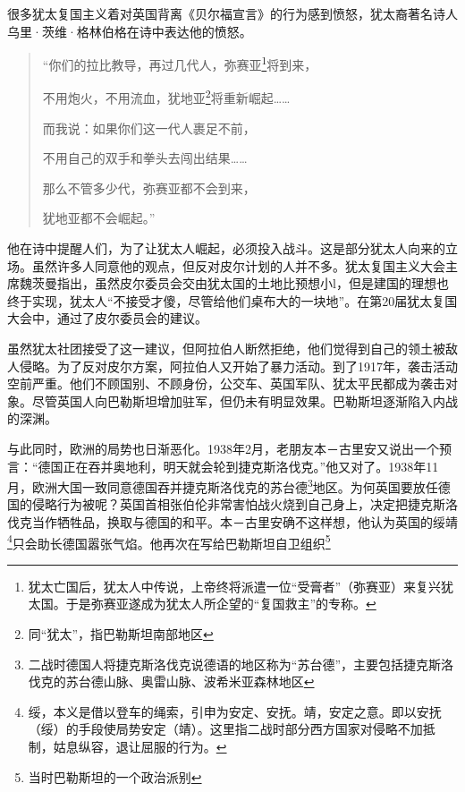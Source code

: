 \documentclass{article}
\begin{document}
很多犹太复国主义着对英国背离《贝尔福宣言》的行为感到愤怒，犹太裔著名诗人乌里·茨维·格林伯格在诗中表达他的愤怒。
\begin{quote}
    “你们的拉比教导，再过几代人，弥赛亚\footnote[1]{犹太亡国后，犹太人中传说，上帝终将派遣一位“受膏者”（弥赛亚）来复兴犹太国。于是弥赛亚遂成为犹太人所企望的“复国救主”的专称。}将到来，

    不用炮火，不用流血，犹地亚\footnote{同“犹太”，指巴勒斯坦南部地区}将重新崛起……

    而我说：如果你们这一代人裹足不前，

    不用自己的双手和拳头去闯出结果……

    那么不管多少代，弥赛亚都不会到来，

    犹地亚都不会崛起。”
\end{quote}
他在诗中提醒人们，为了让犹太人崛起，必须投入战斗。这是部分犹太人向来的立场。虽然许多人同意他的观点，但反对皮尔计划的人并不多。犹太复国主义大会主席魏茨曼指出，虽然皮尔委员会交由犹太国的土地比预想小l，但是建国的理想也终于实现，犹太人“不接受才傻，尽管给他们桌布大的一块地”。在第20届犹太复国大会中，通过了皮尔委员会的建议。

虽然犹太社团接受了这一建议，但阿拉伯人断然拒绝，他们觉得到自己的领土被敌人侵略。为了反对皮尔方案，阿拉伯人又开始了暴力活动。到了1917年，袭击活动空前严重。他们不顾国别、不顾身份，公交车、英国军队、犹太平民都成为袭击对象。尽管英国人向巴勒斯坦增加驻军，但仍未有明显效果。巴勒斯坦逐渐陷入内战的深渊。

与此同时，欧洲的局势也日渐恶化。1938年2月，老朋友本－古里安又说出一个预言：“德国正在吞并奥地利，明天就会轮到捷克斯洛伐克。”他又对了。1938年11月，欧洲大国一致同意德国吞并捷克斯洛伐克的苏台德\footnote[1]{二战时德国人将捷克斯洛伐克说德语的地区称为“苏台德”，主要包括捷克斯洛伐克的苏台德山脉、奥雷山脉、波希米亚森林地区}地区。为何英国要放任德国的侵略行为被呢？英国首相张伯伦非常害怕战火烧到自己身上，决定把捷克斯洛伐克当作牺牲品，换取与德国的和平。本－古里安确不这样想，他认为英国的绥靖\footnote[2]{绥，本义是借以登车的绳索，引申为安定、安抚。靖，安定之意。即以安抚（绥）的手段使局势安定（靖）。这里指二战时部分西方国家对侵略不加抵制，姑息纵容，退让屈服的行为。}只会助长德国嚣张气焰。他再次在写给巴勒斯坦自卫组织\footnote{当时巴勒斯坦的一个政治派别}
\end{document}
